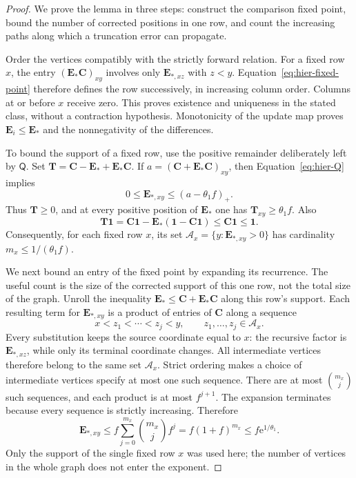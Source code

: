 \documentclass[11pt]{article}
\numberwithin{equation}{section}
\theoremstyle{definition}
\theoremstyle{remark}
\begin{document}
\begin{proof}
We prove the lemma in three steps: construct the comparison fixed point, bound the number of corrected positions in one row, and count the increasing paths along which a truncation error can propagate.

Order the vertices compatibly with the strictly forward relation.  For a
fixed row $x$, the entry $({\mathbf{E}}_*{\mathbf{C}})_{xy}$ involves only ${\mathbf{E}}_{*,xz}$ with
$z<y$.  Equation~\eqref{eq:hier-fixed-point} therefore defines the row
successively, in increasing column order.  Columns at or before $x$
receive zero.  This proves existence and uniqueness in the stated class,
without a contraction hypothesis.  Monotonicity of the update map proves
${\mathbf{E}}_i\leq {\mathbf{E}}_*$ and the nonnegativity of the differences.

To bound the support of a fixed row, use the positive remainder deliberately left by ${\mathsf{Q}}$. Set ${\mathbf{T}}={\mathbf{C}}-{\mathbf{E}}_*+{\mathbf{E}}_*{\mathbf{C}}$. If $a=({\mathbf{C}}+{\mathbf{E}}_*{\mathbf{C}})_{xy}$, then
Equation~\eqref{eq:hier-Q} implies
\[
 0\leq {\mathbf{E}}_{*,xy}\leq(a-\theta_1f)_+.
\]
Thus ${\mathbf{T}}\geq0$, and at every positive position of ${\mathbf{E}}_*$ one has
${\mathbf{T}}_{xy}\geq\theta_1f$.  Also
\begin{equation}
 {\mathbf{T}}\mathbf 1={\mathbf{C}}\mathbf 1-{\mathbf{E}}_*(\mathbf 1-{\mathbf{C}}\mathbf 1)
       \leq {\mathbf{C}}\mathbf 1\leq\mathbf 1.
 \label{eq:hier-fixed-residual-mass}
\end{equation}
Consequently, for each fixed row $x$, its set
${\mathcal{A}}_x=\{y:{\mathbf{E}}_{*,xy}>0\}$ has cardinality
$m_x\leq1/(\theta_1f)$.

We next bound an entry of the fixed point by expanding its recurrence. The useful count is the size of the corrected support of this one row, not the total size of the graph. Unroll the inequality ${\mathbf{E}}_*\leq {\mathbf{C}}+{\mathbf{E}}_*{\mathbf{C}}$ along this row's support.
Each resulting term for ${\mathbf{E}}_{*,xy}$ is a product of entries of ${\mathbf{C}}$
along a sequence
\[
 x<z_1<\cdots<z_j<y,
 \qquad z_1,\ldots,z_j\in {\mathcal{A}}_x.
\]
Every substitution keeps the source coordinate equal to $x$: the
recursive factor is ${\mathbf{E}}_{*,xz}$, while only its terminal coordinate
changes.  All intermediate vertices therefore belong to the same set
${\mathcal{A}}_x$.  Strict ordering makes a choice of intermediate vertices specify
at most one such sequence.
There are at most $\binom{m_x}{j}$ such sequences, and each product
is at most $f^{j+1}$.  The expansion terminates because every sequence
is strictly increasing.  Therefore
\begin{equation}
 {\mathbf{E}}_{*,xy}\leq
 f\sum_{j=0}^{m_x}\binom{m_x}{j}f^j
 =f(1+f)^{m_x}\leq f{\mathrm e}^{1/\theta_1}.
 \label{eq:hier-fixed-entry}
\end{equation}
Only the support of the single fixed row $x$ was used here; the number
of vertices in the whole graph does not enter the exponent.


\end{proof}
\end{document}
